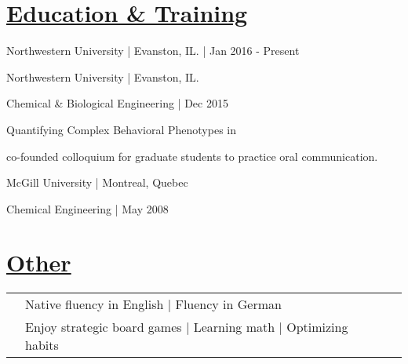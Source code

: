 \documentclass[]{winter-resume-openfont}
\begin{document}
\begin{minipage}[t]{0.65\textwidth}
\sectionsep



\section{\underline{Education \& Training}}
\sectionsep
\begin{tightemize}
\item Northwestern University | Evanston, IL.  | Jan 2016 - Present
\end{tightemize}
\sectionsep

\begin{tightemize}
\item Northwestern University | Evanston, IL. 
\item Chemical \& Biological Engineering | Dec 2015
\end{tightemize}


\begin{tightemize}
\item {} Quantifying Complex Behavioral Phenotypes in 

\item co-founded colloquium for graduate students to practice oral communication.
\end{tightemize}

\sectionsep

\begin{tightemize}
\item McGill University | Montreal, Quebec
\item Chemical Engineering | May 2008
\end{tightemize}

\sectionsep

\section{\underline{Other}}
\begin{tabular}{lll}
\textbullet{}   & 	Native fluency in English | Fluency in German \\
\textbullet{}   & Enjoy strategic board games | Learning math | Optimizing habits\\
\end{tabular}




\end{minipage} 
\end{document}
